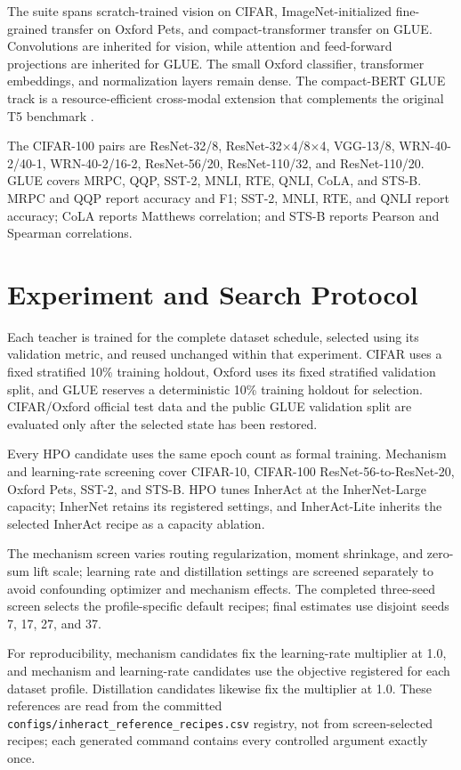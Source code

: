 \documentclass{article}
\begin{document}
The suite spans scratch-trained vision on CIFAR, ImageNet-initialized
fine-grained transfer on Oxford Pets, and compact-transformer transfer on
GLUE.  Convolutions are inherited for vision, while attention and feed-forward
projections are inherited for GLUE.  The small Oxford classifier, transformer
embeddings, and normalization layers remain dense.  The compact-BERT GLUE
track is a resource-efficient cross-modal extension that complements the
original T5 benchmark \cite{zhou2026inhernet}.

The CIFAR-100 pairs are ResNet-32/8, ResNet-32$\times$4/8$\times$4, VGG-13/8,
WRN-40-2/40-1, WRN-40-2/16-2, ResNet-56/20, ResNet-110/32, and
ResNet-110/20.  GLUE covers MRPC, QQP, SST-2, MNLI, RTE, QNLI, CoLA, and
STS-B.  MRPC and QQP report accuracy and F1; SST-2, MNLI, RTE, and QNLI
report accuracy; CoLA reports Matthews correlation; and STS-B reports Pearson
and Spearman correlations.

\section{Experiment and Search Protocol}

Each teacher is trained for the complete dataset schedule, selected using its
validation metric, and reused unchanged within that experiment.  CIFAR uses a
fixed stratified 10\% training holdout, Oxford uses its fixed stratified
validation split, and GLUE reserves a deterministic 10\% training holdout for
selection.  CIFAR/Oxford official test data and the public GLUE validation
split are evaluated only after the selected state has been restored.

Every HPO candidate uses the same epoch count as formal training.  Mechanism
and learning-rate screening cover CIFAR-10, CIFAR-100
ResNet-56-to-ResNet-20, Oxford Pets, SST-2, and STS-B.  HPO tunes InherAct at
the InherNet-Large capacity; InherNet retains its registered settings, and
InherAct-Lite inherits the selected InherAct recipe as a capacity ablation.

The mechanism screen varies routing regularization, moment shrinkage, and
zero-sum lift scale; learning rate and distillation settings are screened
separately to avoid confounding optimizer and mechanism effects.  The completed
three-seed screen selects the profile-specific default recipes; final estimates
use disjoint seeds 7, 17, 27, and 37.

For reproducibility, mechanism candidates fix the learning-rate multiplier at
1.0, and mechanism and learning-rate candidates use the objective registered
for each dataset profile.  Distillation candidates likewise fix the multiplier
at 1.0.  These references are read from the committed
\texttt{configs/inheract\_reference\_recipes.csv} registry, not from
screen-selected recipes; each generated command contains every
controlled argument exactly once.
\end{document}
